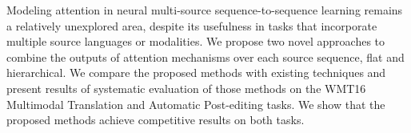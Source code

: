 Modeling attention in neural multi-source sequence-to-sequence learning remains a relatively unexplored area, despite its usefulness in tasks that incorporate multiple source languages or modalities. We propose two novel approaches to combine the outputs of attention mechanisms over each source sequence, flat and hierarchical. We compare the proposed methods with existing techniques and present results of systematic evaluation of those methods on the WMT16 Multimodal Translation and Automatic Post-editing tasks. We show that the proposed methods achieve competitive results on both tasks.
